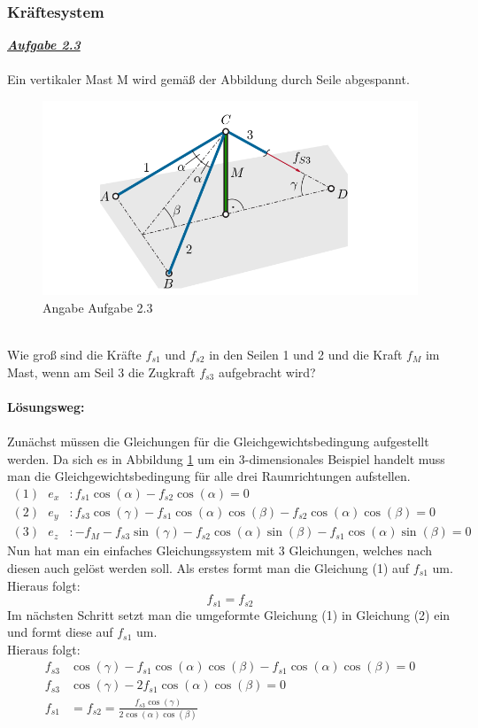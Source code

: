 \documentclass[a4paper,12p]{article}
\begin{document}
\subsubsection{Kräftesystem}
\textbf{\textit{\underline{Aufgabe 2.3}}} \\ \\
Ein vertikaler Mast M wird gemäß der Abbildung durch Seile abgespannt.
\begin{figure}[h]
\begin{center}
\includegraphics[width=12.5cm]{pic/Angabe}
\caption{Angabe Aufgabe 2.3}
\label{Angabe}
\end{center}
\end{figure} \\
Wie groß sind die Kräfte $ f_{s1} $ und $ f_{s2} $ in den Seilen 1 und 2 und die Kraft $ f_M $ im Mast, wenn am Seil 3 die Zugkraft $ f_{s3} $ aufgebracht wird? \\ \\
\textbf{Lösungsweg:} \\ \\
Zunächst müssen die Gleichungen für die Gleichgewichtsbedingung aufgestellt werden. Da sich es in Abbildung \ref{Angabe} um ein 3-dimensionales Beispiel handelt muss man die Gleichgewichtsbedingung für alle drei Raumrichtungen aufstellen.
\begin{align*}
	(1) \ \ \ e_x & : f_{s1}\cos(\alpha) - f_{s2}\cos(\alpha) = 0 \\
	(2) \ \ \ e_y & : f_{s3}\cos(\gamma) - f_{s1}\cos(\alpha)\cos(\beta) - f_{s2}\cos(\alpha)\cos(\beta) = 0 \\  
	(3) \ \ \ e_z & : -f_M - f_{s3}\sin(\gamma) - f_{s2}\cos(\alpha)\sin(\beta) - f_{s1}\cos(\alpha)\sin(\beta) = 0
\end{align*}
Nun hat man ein einfaches Gleichungssystem mit 3 Gleichungen, welches nach diesen auch gelöst werden soll. Als erstes formt man die Gleichung (1) auf $f_{s1}$ um. \\ 
Hieraus folgt:
\begin{equation*}
	f_{s1} = f_{s2}
\end{equation*}
Im nächsten Schritt setzt man die umgeformte Gleichung (1) in Gleichung (2) ein und formt diese auf $ f_{s1} $ um. \\
Hieraus folgt:
\begin{align*}
	f_{s3}&\cos(\gamma) - f_{s1}\cos(\alpha)\cos(\beta) - f_{s1}\cos(\alpha)\cos(\beta) = 0 \\
	f_{s3}&\cos(\gamma) - 2f_{s1}\cos(\alpha)\cos(\beta) = 0 \\
	f_{s1}&=f_{s2} = \frac{f_{s3}\cos(\gamma)}{2\cos(\alpha)\cos(\beta)}
\end{align*}
\end{document}
